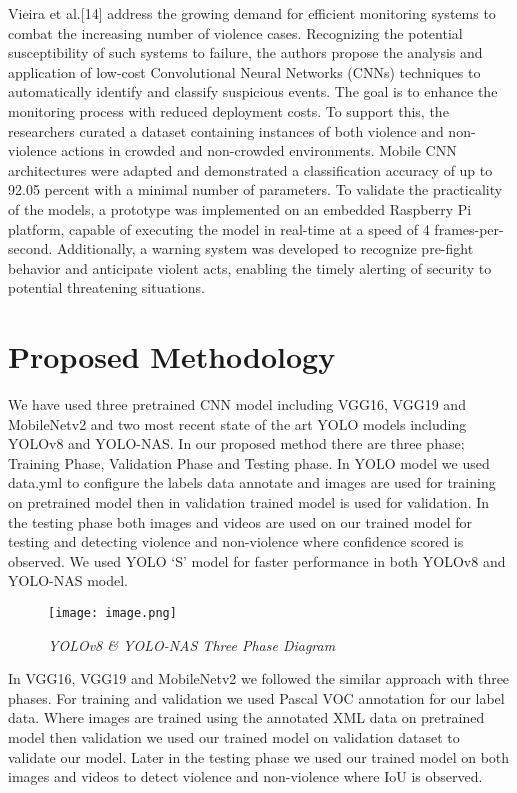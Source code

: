 \documentclass[conference]{IEEEtran}
\begin{document}
Vieira et al.[14] address the growing demand for efficient monitoring systems to combat the increasing number of violence cases. Recognizing the potential susceptibility of such systems to failure, the authors propose the analysis and application of low-cost Convolutional Neural Networks (CNNs) techniques to automatically identify and classify suspicious events. The goal is to enhance the monitoring process with reduced deployment costs. To support this, the researchers curated a dataset containing instances of both violence and non-violence actions in crowded and non-crowded environments. Mobile CNN architectures were adapted and demonstrated a classification accuracy of up to 92.05 percent with a minimal number of parameters. To validate the practicality of the models, a prototype was implemented on an embedded Raspberry Pi platform, capable of executing the model in real-time at a speed of 4 frames-per-second. Additionally, a warning system was developed to recognize pre-fight behavior and anticipate violent acts, enabling the timely alerting of security to potential threatening situations.\\


\section{Proposed Methodology}
We have used three pretrained CNN model including VGG16, VGG19 and MobileNetv2 and two most recent state of the art YOLO models including YOLOv8 and YOLO-NAS. In our proposed method there are three phase; Training Phase, Validation Phase and Testing phase. In YOLO model we used data.yml to configure the labels data annotate and images are used for training on pretrained model then in validation trained model is used for validation. In the testing phase both images and videos are used on our trained model for testing and detecting violence and non-violence where confidence scored is observed. We used YOLO ‘S’ model for faster performance in both YOLOv8 and YOLO-NAS model.
\begin{figure}
    \centering
    \texttt{[image: image.png]}
    \caption{\textit{YOLOv8 \& YOLO-NAS Three Phase Diagram} 
}
    \label{fig: 1:}
\end{figure}
In VGG16, VGG19 and MobileNetv2 we followed the similar approach with three phases. For training and validation we used Pascal VOC annotation for our label data. Where images are trained using the annotated XML data on pretrained model then validation we used our trained model on validation dataset to validate our model. Later in the testing phase we used our trained model on both images and videos to detect violence and non-violence where IoU is observed.
\end{document}
